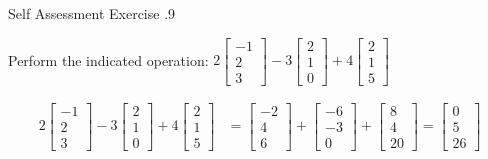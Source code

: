 \documentclass[\main/notes.tex]{subfiles}
\begin{document}
				\begin{exercise}{Self Assessment Exercise \thechapter.9}
					\begin{questions}
						\item Perform the indicated operation:
							$ 2\begin{bmatrix}
								-1 \\ 2 \\ 3
							\end{bmatrix} - 3 \begin{bmatrix}
								2 \\ 1 \\ 0
							\end{bmatrix} + 4 \begin{bmatrix}
								2 \\ 1 \\ 5
							\end{bmatrix} $
							\begin{answer}
								\begin{align*}
									2\begin{bmatrix}
										-1 \\ 2 \\ 3
									\end{bmatrix} - 3 \begin{bmatrix}
										2 \\ 1 \\ 0
									\end{bmatrix} + 4 \begin{bmatrix}
										2 \\ 1 \\ 5
									\end{bmatrix} &= \begin{bmatrix}
										-2 \\ 4 \\ 6
									\end{bmatrix} + \begin{bmatrix}
										-6 \\ -3 \\ 0
									\end{bmatrix} + \begin{bmatrix}
										8 \\ 4 \\ 20
									\end{bmatrix} = \begin{bmatrix}
										0 \\ 5 \\ 26
									\end{bmatrix}
								\end{align*}
							\end{answer}
					\end{questions}
				\end{exercise}
			\pagebreak
\end{document}

